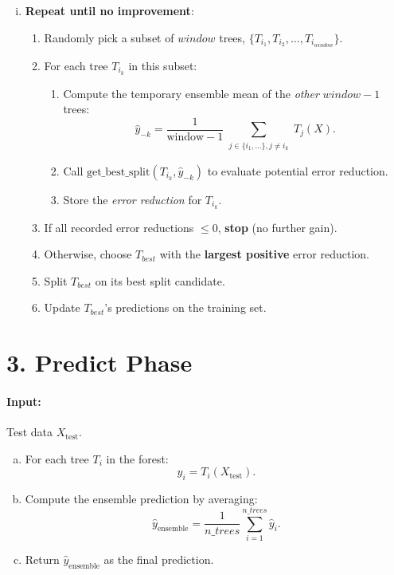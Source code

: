 \documentclass{article}
\begin{document}
\begin{enumerate}[(a)]
    \begin{enumerate}[(i)]
        \item \textbf{Repeat until no improvement}:
        \begin{enumerate}
            \item Randomly pick a subset of $window$ trees, $\{T_{i_1}, T_{i_2}, \ldots, T_{i_{window}}\}$.
            \item For each tree $T_{i_k}$ in this subset:
            \begin{enumerate}
                \item Compute the temporary ensemble mean of the \textit{other} $window - 1$ trees:
                \[
                    \hat{y}_{-k} = \frac{1}{\text{window} - 1}
                       \sum_{\substack{j \in \{i_1,\dots\}, j \neq i_k}} T_j(X).
                \]
                \item Call $\text{get\_best\_split}(T_{i_k}, \hat{y}_{-k})$ to evaluate potential error reduction.
                \item Store the \textit{error reduction} for $T_{i_k}$.
            \end{enumerate}
            \item If all recorded error reductions $\le 0$, \textbf{stop} (no further gain).
            \item Otherwise, choose $T_{best}$ with the \textbf{largest positive} error reduction.
            \item Split $T_{best}$ on its best split candidate.
            \item Update $T_{best}$'s predictions on the training set.
        \end{enumerate}
    \end{enumerate}
\end{enumerate}

\section*{3. Predict Phase}

\paragraph{Input:} Test data $X_{\text{test}}$.
\begin{enumerate}[(a)]
    \item For each tree $T_i$ in the forest:
    \[
      \hat{y}_i = T_i(X_{\text{test}}).
    \]
    \item Compute the ensemble prediction by averaging:
    \[
      \hat{y}_{\text{ensemble}} = \frac{1}{n\_trees} \sum_{i=1}^{n\_trees} \hat{y}_i.
    \]
    \item Return $\hat{y}_{\text{ensemble}}$ as the final prediction.
\end{enumerate}
\end{document}
